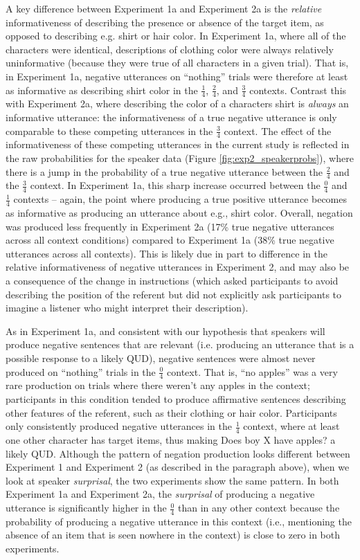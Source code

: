 \documentclass[man, floatsintext, noapacite]{apa6}
\begin{document}
A key difference between Experiment 1a and Experiment 2a is the \textit{relative} informativeness of describing the presence or absence of the target item, as opposed to describing e.g. shirt or hair color. In Experiment 1a, where all of the characters were identical, descriptions of clothing color were always relatively uninformative (because they were true of all characters in a given trial). That is, in Experiment 1a, negative utterances on ``nothing'' trials were therefore at least as informative as describing shirt color in the $\frac{1}{4}$, $\frac{2}{4}$, and $\frac{3}{4}$ contexts. Contrast this with Experiment 2a, where describing the color of a characters shirt is \textit{always} an informative utterance: the informativeness of a true negative utterance is only comparable to these competing utterances in the $\frac{3}{4}$ context. The effect of the informativeness of these competing utterances in the current study is reflected in the raw probabilities for the speaker data (Figure \ref{fig:exp2_speakerprobs}), where there is a jump in the probability of a true negative utterance between the $\frac{2}{4}$ and the $\frac{3}{4}$ context. In Experiment 1a, this sharp increase occurred between the $\frac{0}{4}$ and $\frac{1}{4}$ contexts -- again, the point where producing a true positive utterance becomes as informative as producing an utterance about e.g., shirt color. Overall, negation was produced less frequently in Experiment 2a (17\% true negative utterances across all context conditions) compared to Experiment 1a (38\% true negative utterances across all contexts). This is likely due in part to difference in the relative informativeness of negative utterances in Experiment 2, and may also be a consequence of the change in instructions (which asked participants to avoid describing the position of the referent but did not explicitly ask participants to imagine a listener who might interpret their description). 

As in Experiment 1a, and consistent with our hypothesis that speakers will produce negative sentences that are relevant (i.e. producing an utterance that is a possible response to a likely QUD), negative sentences were almost never produced on “nothing” trials in the $\frac{0}{4}$ context. That is, “no apples” was a very rare production on trials where there weren’t any apples in the context; participants in this condition tended to produce affirmative sentences describing other features of the referent, such as their clothing or hair color. Participants only consistently produced negative utterances in the $\frac{1}{4}$ context, where at least one other character has target items, thus making Does boy X have apples? a likely QUD. Although the pattern of negation production looks different between Experiment 1 and Experiment 2 (as described in the paragraph above), when we look at speaker \textit{surprisal}, the two experiments show the same pattern. In both Experiment 1a and Experiment 2a, the \textit{surprisal} of producing a negative utterance is significantly higher in the $\frac{0}{4}$ than in any other context because the probability of producing a negative utterance in this context (i.e., mentioning the absence of an item that is seen nowhere in the context) is close to zero in both experiments. 
\end{document}
